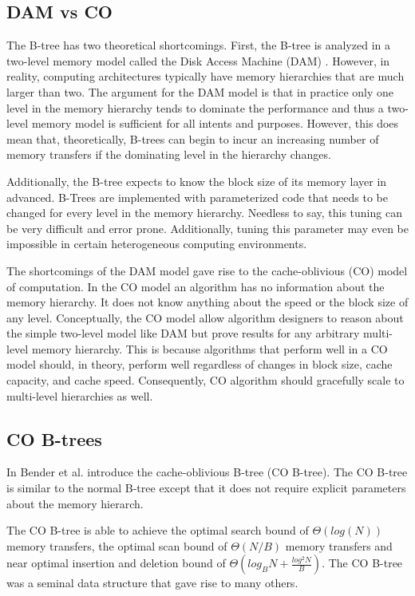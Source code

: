 \documentclass{style}
\begin{document}
\subsection{DAM vs CO}

The B-tree has two theoretical shortcomings. First, the B-tree is analyzed in
a two-level memory model called the Disk Access Machine (DAM) \cite{Aggarwal}.
However, in reality, computing architectures typically have memory hierarchies
that are much larger than two. The argument for the DAM model is that in
practice only one level in the memory hierarchy tends to dominate the
performance and thus a two-level memory model is sufficient for all intents
and purposes. However, this does mean that, theoretically, B-trees can begin
to incur an increasing number of memory transfers if the dominating level in
the hierarchy changes.

Additionally, the B-tree expects to know the block size of its memory layer in
advanced. B-Trees are implemented with parameterized code that needs to be
changed for every level in the memory hierarchy. Needless to say, this tuning
can be very difficult and error prone. Additionally, tuning this parameter may
even be impossible in certain heterogeneous computing environments.

The shortcomings of the DAM model gave rise to the cache-oblivious (CO) model
of computation. In the CO model an algorithm has no information about the
memory hierarchy. It does not know anything about the speed or the block size
of any level. Conceptually, the CO model allow algorithm designers to reason
about the simple two-level model like DAM but prove results for any arbitrary
multi-level memory hierarchy. This is because algorithms that perform well in
a CO model should, in theory, perform well regardless of changes in block
size, cache capacity, and cache speed. Consequently, CO algorithm should
gracefully scale to multi-level hierarchies as well.

\subsection{CO B-trees}

In \cite{BenderDemainColton} Bender et al. introduce the cache-oblivious
B-tree (CO B-tree). The CO B-tree is similar to the normal B-tree except that
it does not require explicit parameters about the memory hierarch.

The CO B-tree is able to achieve the optimal search bound of $\Theta(log(N))$
memory transfers, the optimal scan bound of $\Theta(N/B)$ memory transfers and
near optimal insertion and deletion bound of $\Theta(log_B N +
\frac{log^2{N}}{B})$. The CO B-tree was a seminal data structure that gave
rise to many others.
\end{document}
